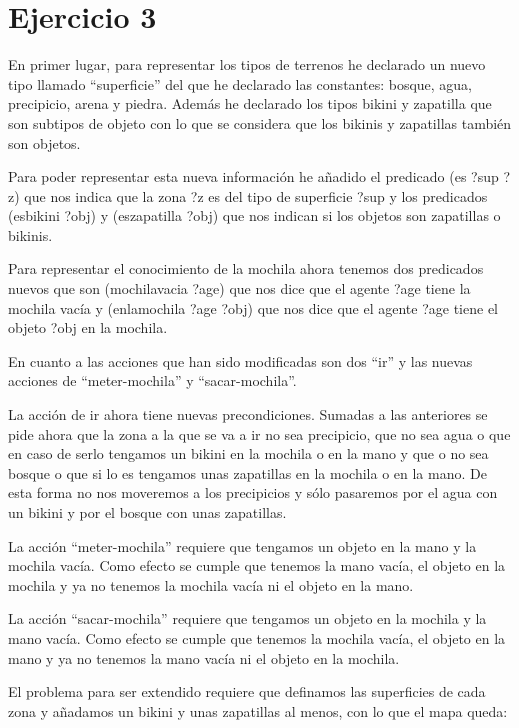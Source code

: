 \documentclass[12pt,a4paper]{article}
\begin{document}
\section{Ejercicio 3}

En primer lugar, para representar los tipos de terrenos he declarado un nuevo tipo llamado ``superficie'' del que he declarado las constantes: bosque, agua, precipicio, arena y piedra. Además he declarado los tipos bikini y zapatilla que son subtipos de objeto con lo que se considera que los bikinis y zapatillas también son objetos.

Para poder representar esta nueva información he añadido el predicado (es ?sup ?z) que nos indica que la zona ?z es del tipo de superficie ?sup y los predicados (esbikini ?obj) y (eszapatilla ?obj) que nos indican si los objetos son zapatillas o bikinis.

Para representar el conocimiento de la mochila ahora tenemos dos predicados nuevos que son (mochilavacia ?age) que nos dice que el agente ?age tiene la mochila vacía y (enlamochila ?age ?obj) que nos dice que el agente ?age tiene el objeto ?obj en la mochila.

En cuanto a las acciones que han sido modificadas son dos ``ir'' y las nuevas acciones de ``meter-mochila'' y ``sacar-mochila''.

La acción de ir ahora tiene nuevas precondiciones. Sumadas a las anteriores se pide ahora que la zona a la que se va a ir no sea precipicio, que no sea agua o que en caso de serlo tengamos un bikini en la mochila o en la mano y que o no sea bosque o que si lo es tengamos unas zapatillas en la mochila o en la mano. De esta forma no nos moveremos a los precipicios y sólo pasaremos por el agua con un bikini y por el bosque con unas zapatillas.

La acción ``meter-mochila'' requiere que tengamos un objeto en la mano y la mochila vacía. Como efecto se cumple que tenemos la mano vacía, el objeto en la mochila y ya no tenemos la mochila vacía ni el objeto en la mano.

La acción ``sacar-mochila'' requiere que tengamos un objeto en la mochila y la mano vacía. Como efecto se cumple que tenemos la mochila vacía, el objeto en la mano y ya no tenemos la mano vacía ni el objeto en la mochila.

El problema para ser extendido requiere que definamos las superficies de cada zona y añadamos un bikini y unas zapatillas al menos, con lo que el mapa queda:

\end{document}
